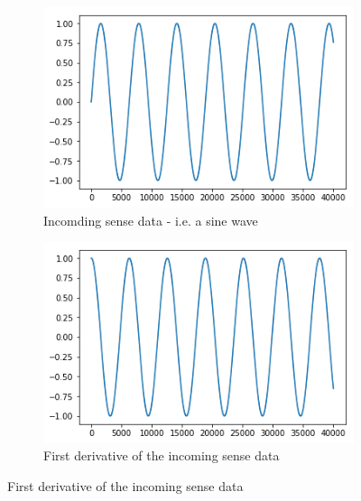 \begin{figure}[H]
\centering
\begin{subfigure}{.3\linewidth}
    \centering
    \includegraphics[scale=0.5]{chapter_3_figures/dynamics_sine_wave_phi.png}
    \caption{Incomding sense data - i.e. a sine wave}
\end{subfigure}
    \hfill
\begin{subfigure}{.3\linewidth}
    \centering
    \includegraphics[scale=0.5]{chapter_3_figures/dynamics_sine_wave_phidot.png}
    \caption{First derivative of the incoming sense data}
\end{subfigure}


\end{figure}
